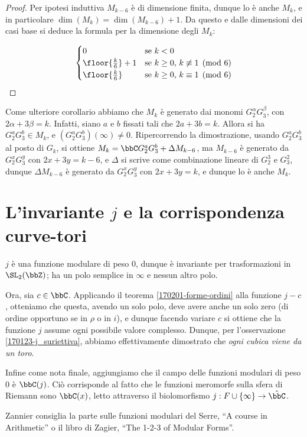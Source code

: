 \begin{proof}
	Per ipotesi induttiva $M_{k-6}$ è di dimensione finita, dunque lo è anche $M_k$, e in particolare $\dim(M_k)=\dim(M_{k-6})+1$.
	Da questo e dalle dimensioni dei casi base si deduce la formula per la dimensione degli $M_k$:
	
	\begin{equation*}
		\begin{cases}
			0 						&	\text{se $k<0$}\\
			\floor{\frac{k}{6}} +1	&	\text{se $k\geq0$, $k\not\equiv1\pmod{6}$}\\
			\floor{\frac{k}{6}}		&	\text{se $k\geq0$, $k\equiv1\pmod{6}$}
		\end{cases}
	\end{equation*}

\end{proof}

Come ulteriore corollario abbiamo che $M_k$ è generato dai monomi $G_2^\alpha G_3^\beta$, con $2\alpha+3\beta=k$.
Infatti, siano $a$ e $b$ fissati tali che $2a+3b=k$.
Allora si ha $G_2^a G_3^b\in M_k$, e $(G_2^a G_3^b)(\infty)\neq0$.
Ripercorrendo la dimostrazione, usando $G_2^a G_3^b$ al posto di $G_k$, si ottiene $M_k=\bbC G_2^a G_3^b + \Delta M_{k-6}$, ma $M_{k-6}$ è generato da $G_2^x G_3^y$ con $2x+3y=k-6$, e $\Delta$ si scrive come combinazione lineare di $G_2^3$ e $G_3^2$, dunque $\Delta M_{k-6}$ è generato da $G_2^x G_3^y$ con $2x+3y=k$, e dunque lo è anche $M_k$.


\section{L'invariante $j$ e la corrispondenza curve-tori}

$j$ è una funzione modulare di peso $0$, dunque è invariante per trasformazioni in $\SL_2(\bbZ)$; ha un polo semplice in $\infty$ e nessun altro polo.

Ora, sia $c \in \bbC$. Applicando il teorema \ref{170201-forme-ordini} alla funzione $j-c$, otteniamo che questa, avendo un solo polo, deve avere anche un solo zero (di ordine opportuno se in $\rho$ o in $i$), e dunque facendo variare $c$ si ottiene che la funzione $j$ assume ogni possibile valore complesso. Dunque, per l'osservazione \ref{170123-j_suriettiva}, abbiamo effettivamente dimostrato che \emph{ogni cubica viene da un toro}.

Infine come nota finale, aggiungiamo che il campo delle funzioni modulari di peso $0$ è $\bbC(j)$. Ciò corrisponde al fatto che le funzioni meromorfe sulla sfera di Riemann sono $\bbC(x)$, letto attraverso il biolomorfismo $j : F \cup \{ \infty \} \rightarrow \hat \bbC$.

Zannier consiglia la parte sulle funzioni modulari del Serre, ``A course in Arithmetic'' o il libro di Zagier, ``The 1-2-3 of Modular Forms''.

